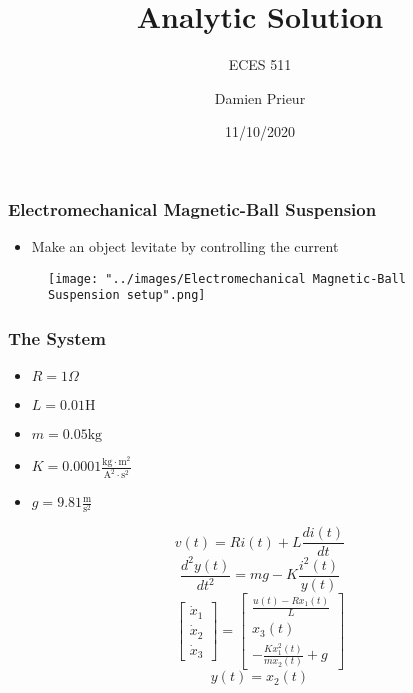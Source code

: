 \documentclass{beamer}
\title{Analytic Solution}
\subtitle{ECES 511}
\author{Damien Prieur}
\date{11/10/2020}
\begin{document}
\frame{\titlepage}

\begin{frame}
\frametitle{Electromechanical Magnetic-Ball Suspension}
\begin{itemize}[$\bullet$]
\item Make an object levitate by controlling the current
\end{itemize}
\begin{figure}
\texttt{[image: "../images/Electromechanical Magnetic-Ball Suspension setup".png]}
\end{figure}
\end{frame}

\begin{frame}
\frametitle{The System}
\begin{itemize}
\item $R = 1 \Omega $
\item $L = 0.01 \text{H}$
\item $m = 0.05 \text{kg}$
\item $K = 0.0001 \frac{\text{kg}\cdot\text{m}^2}{\text{A}^2\cdot\text{s}^2}$
\item $g = 9.81 \frac{\text{m}}{\text{s}^2}$
\end{itemize}
$$ v(t) = Ri(t) + L \frac{di(t)}{dt} $$
$$ \frac{d^2y(t)}{dt^2} = mg - K \frac{i^2(t)}{y(t)} $$
$$
\begin{bmatrix}
\dot{x}_1 \\
\dot{x}_2 \\
\dot{x}_3
\end{bmatrix}
=
\begin{bmatrix}
\frac{u(t)-Rx_1(t)}{L} \\
x_3(t) \\
-\frac{Kx_1^2(t)}{mx_2(t)} + g
\end{bmatrix}
$$
$$
y(t) = x_2(t)
$$
\end{frame}
\end{document}
